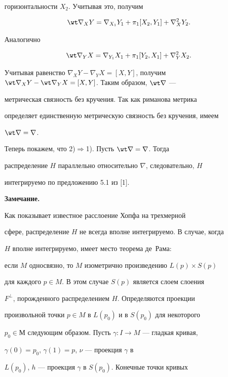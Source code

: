 горизонтальности $X_2$. Учитывая это, получим


$$


\wt \nabla_XY=\nabla_{X_1}Y_1+\pi_1[X_2, Y_1] +\nabla^2_{X}Y_2.


$$


Аналогично


$$


\wt \nabla_YX=\nabla_{Y_1}X_1+\pi_1[Y_2,X_1] + \nabla^2_{Y}X_2.


$$


Учитывая равенство $\nabla_XY-\nabla_YX=[X,Y]$, получим $\wt 


\nabla_XY - \wt \nabla_YX=[X,Y]$. Таким образом, $\wt \nabla$ ---


метрическая связность без кручения. Так как риманова метрика 


определяет единственную метрическую связность без кручения, имеем 


$\wt \nabla =\nabla$.





Теперь покажем, что 2)$\Rightarrow$1). Пусть $\wt \nabla =\nabla$. Тогда 


распределение $H$ параллельно относительно $\nabla$, следовательно, $H$ 


интегрируемо по предложению 5.1 из [1].


\medskip





{\bf Замечание.}


Как показывает известное расслоение Хопфа на трехмерной 


сфере, распределение $H$ не всегда вполне интегрируемо. В случае, когда 


$H$ вполне интегрируемо, имеет место теорема де~Рама: 


если $M$ односвязно, то $M$ изометрично произведению $L(p)\times S(p)$ 


для каждого $p\in M$. В этом случае $S(p)$ является слоем слоения 


$F^\bot$, порожденного распределением $H$. Определяются проекции 


произвольной точки $p\in M$ в $L(p_0)$ и в $S(p_0)$ для некоторого 


$p_0\in М$ следующим образом. Пусть $\gamma:I\to M$ --- гладкая кривая, 


$\gamma (0)= p_0$, $\gamma (1)= p$, $\nu$ --- проекция $\gamma$ в 


$L(p_0)$, $h$ --- проекция $\gamma$ в $S(p_0)$. Конечные точки кривых 


